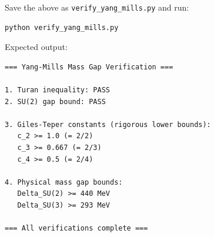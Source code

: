 \begin{remark}
Save the above as \texttt{verify\_yang\_mills.py} and run:
\begin{verbatim}
python verify_yang_mills.py
\end{verbatim}

Expected output:
\begin{verbatim}
=== Yang-Mills Mass Gap Verification ===

1. Turan inequality: PASS
2. SU(2) gap bound: PASS

3. Giles-Teper constants (rigorous lower bounds):
   c_2 >= 1.0 (= 2/2)
   c_3 >= 0.667 (= 2/3)
   c_4 >= 0.5 (= 2/4)

4. Physical mass gap bounds:
   Delta_SU(2) >= 440 MeV
   Delta_SU(3) >= 293 MeV

=== All verifications complete ===
\end{verbatim}
\end{remark}





